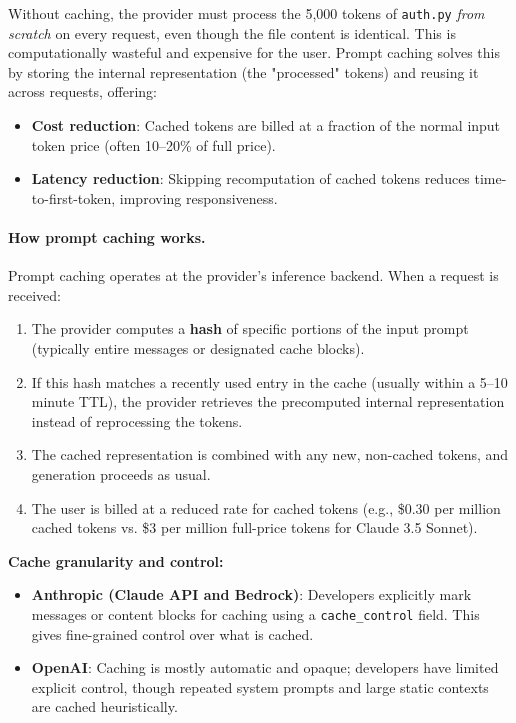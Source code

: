 \documentclass[english]{article}
\begin{document}
Without caching, the provider must process the 5,000 tokens of \texttt{auth.py} \emph{from scratch} on every request, even though the file content is identical. This is computationally wasteful and expensive for the user. Prompt caching solves this by storing the internal representation (the "processed" tokens) and reusing it across requests, offering:
\begin{itemize}
    \item \textbf{Cost reduction}: Cached tokens are billed at a fraction of the normal input token price (often 10--20\% of full price).
    \item \textbf{Latency reduction}: Skipping recomputation of cached tokens reduces time-to-first-token, improving responsiveness.
\end{itemize}

\paragraph{How prompt caching works.}

Prompt caching operates at the provider's inference backend. When a request is received:
\begin{enumerate}
    \item The provider computes a \textbf{hash} of specific portions of the input prompt (typically entire messages or designated cache blocks).
    \item If this hash matches a recently used entry in the cache (usually within a 5--10 minute TTL), the provider retrieves the precomputed internal representation instead of reprocessing the tokens.
    \item The cached representation is combined with any new, non-cached tokens, and generation proceeds as usual.
    \item The user is billed at a reduced rate for cached tokens (e.g., \$0.30 per million cached tokens vs. \$3 per million full-price tokens for Claude 3.5 Sonnet).
\end{enumerate}

\textbf{Cache granularity and control:}
\begin{itemize}
    \item \textbf{Anthropic (Claude API and Bedrock)}: Developers explicitly mark messages or content blocks for caching using a \texttt{cache\_control} field. This gives fine-grained control over what is cached.
    \item \textbf{OpenAI}: Caching is mostly automatic and opaque; developers have limited explicit control, though repeated system prompts and large static contexts are cached heuristically.
\end{itemize}
\end{document}

